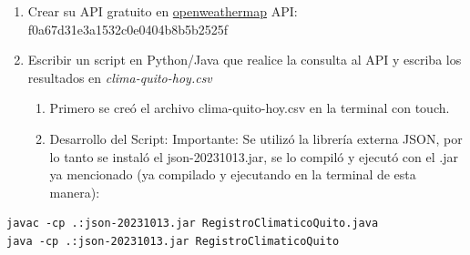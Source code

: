 \documentclass{article}
\begin{document}
\begin{enumerate}
\item Crear su API gratuito en \href{https://openweathermap.org/current\#one}{openweathermap}
API: f0a67d31e3a1532c0e0404b8b5b2525f
\item Escribir un script en Python/Java que realice la consulta al API y
escriba los resultados en \emph{clima-quito-hoy.csv}
\begin{enumerate}
\item Primero se creó el archivo clima-quito-hoy.csv en la terminal
con touch.
\item Desarrollo del Script:
Importante: Se utilizó la librería externa JSON, por lo tanto se
instaló el json-20231013.jar, se lo compiló y ejecutó con el
.jar ya mencionado (ya compilado y ejecutando en la terminal de
esta manera):
\end{enumerate}
\end{enumerate}

\begin{verbatim}
javac -cp .:json-20231013.jar RegistroClimaticoQuito.java
java -cp .:json-20231013.jar RegistroClimaticoQuito
\end{verbatim}
\end{document}
